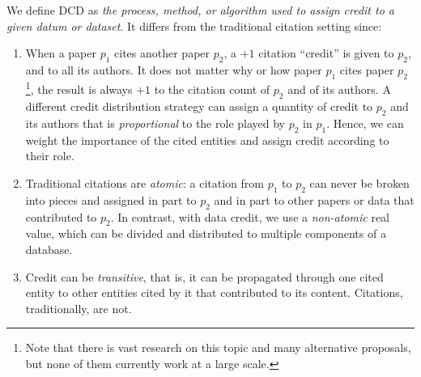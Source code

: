 \documentclass[preprint,12pt,sort&compress]{elsarticle}
\begin{document}
We define DCD as {\em the process, method, or algorithm used to assign credit to a given datum or dataset}. It differs from the traditional citation setting since: 
\begin{enumerate}
    \item \textcolor{correction}{When a paper $p_1$ cites another paper $p_2$, a $+1$ citation ``credit'' is given to $p_2$, and to all its authors. It does not matter why or how paper $p_1$ cites paper $p_2$\footnote{Note that there is vast research on this topic and many alternative proposals, but none of them currently work at a large scale.}, the result is always $+1$ to the citation count of $p_2$ and of its authors. A different credit distribution strategy can assign a quantity of credit to $p_2$ and its authors that is \emph{proportional} to the role played by $p_2$ in $p_1$. Hence, we can weight the importance of the cited entities and assign credit according to their role.}
    \item \textcolor{correction}{Traditional citations are \emph{atomic}: a citation from $p_1$ to $p_2$ can never be broken into pieces and assigned in part to $p_2$ and in part to other papers or data that contributed to $p_2$. 
	In contrast, with data credit, we use a \emph{non-atomic} real value, which can be divided and distributed to multiple components of a database.} 
	\item Credit can be \emph{transitive}, that is, it can be propagated through one cited entity to other entities cited by it that contributed to its content. Citations, traditionally, are not. 
\end{enumerate}

\end{document}
